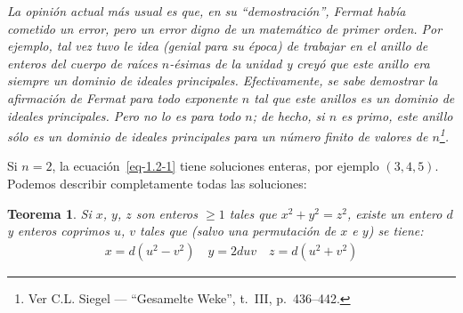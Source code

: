 \documentclass[10pt,oneside,bibtotoc,smallheadings,leqno,a5paper,DIV=12]{scrbook}
\numberwithin{equation}{section}
\newenvironment{comm}%
	{\begin{trivlist}\item\small\itshape}
	{\end{trivlist}}
\theoremstyle{defi}
\theoremstyle{enonce}
\newtheorem{theorem}{Teorema}
\theoremstyle{rem}
\numberwithin{theorem}{section}
\numberwithin{proposition}{section}
\numberwithin{definition}{section}
\numberwithin{lemma}{section}
\numberwithin{corollary}{section}
\numberwithin{example}{section}
\numberwithin{footnote}{section}%
\begin{document}
\begin{comm}
La opini\'on actual m\'as usual es que, en su ``demostraci\'on'', Fermat hab\'ia cometido
un error, pero un error digno de un matem\'atico de primer orden. Por ejemplo, tal vez
tuvo le idea (genial para su \'epoca) de trabajar en el anillo de enteros del cuerpo de
ra\'ices $n$-\'esimas de la unidad y crey\'o que este anillo era siempre un dominio de ideales
principales. Efectivamente, se sabe demostrar la afirmaci\'on de Fermat para todo exponente $n$
tal que este anillos es un dominio de ideales principales. Pero no lo es para todo $n$;
de hecho,
si $n$ es primo, este anillo s\'olo es un dominio de ideales principales para un n\'umero
finito de valores de $n$\footnote{Ver C.L. Siegel --- ``Gesamelte Weke'', t.~III, p.~436--442.}.
\end{comm}

Si $n=2$, la ecuaci\'on~\eqref{eq-1.2-1} tiene soluciones enteras, por
ejemplo $(3,4,5)$. Podemos describir completamente todas las soluciones:

\begin{theorem}\label{teo1.2.1}
Si $x$, $y$, $z$ son enteros $\geq 1$ tales que $x^{2}+y^{2}=z^{2}$, existe un entero
$d$ y enteros coprimos $u$, $v$ tales que (salvo una permutaci\'on de $x$ e $y$) se tiene:
\begin{gather}\label{eq-1.2-2}
x = d(u^{2}-v^{2})\quad y = 2duv\quad z = d(u^{2}+v^{2})
\end{gather}
\end{theorem}
\end{document}
